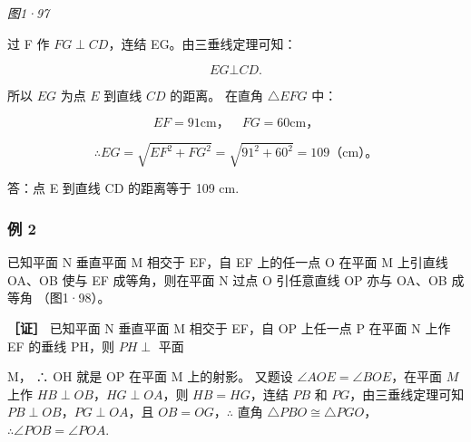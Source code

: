 \emph{图1·97}

过 F 作 \(FG \perp CD\)，连结 EG。由三垂线定理可知：

\[
E G \bot C D.
\]

所以 \(EG\) 为点 \(E\) 到直线 \(CD\) 的距离。 在直角 \(\triangle EFG\)
中：

\[
E F = 91 \mathrm{cm}\text{，} \quad F G = 60 \mathrm{cm}\text{，}
\]

\[
\therefore E G = \sqrt {E F ^ {2} + F G ^ {2}} = \sqrt {91^{2} + 60^{2}} = 109 \text{（}\mathrm{cm}\text{）。}
\]

答：点 E 到直线 CD 的距离等于 109 cm.

\subsubsection{例 2}

已知平面 N 垂直平面 M 相交于 EF，自 EF 上的任一点 O 在平面 M 上引直线
OA、OB 使与 EF 成等角，则在平面 N 过点 O 引任意直线 OP 亦与 OA、OB
成等角 （图1·98）。

\textbf{［证］} 已知平面 N 垂直平面 M 相交于 EF，自 OP 上任一点 P 在平面
N 上作 EF 的垂线 PH，则 \(PH \perp\) 平面

M， ∴ OH 就是 OP 在平面 M 上的射影。 又题设
\(\angle AOE =\)\(\angle BOE\)，在平面 \(M\) 上作
\(HB \perp OB\)，\(HG \perp OA\)，则 \(HB = HG\)，连结 \(PB\) 和
\(PG\)，由三垂线定理可知 \(PB \perp OB\)，\(PG \perp OA\)，且
\(OB = OG\)，\(\therefore\) 直角
\(\triangle PBO \cong \triangle PGO\)，\(\therefore \angle POB = \angle POA\).

